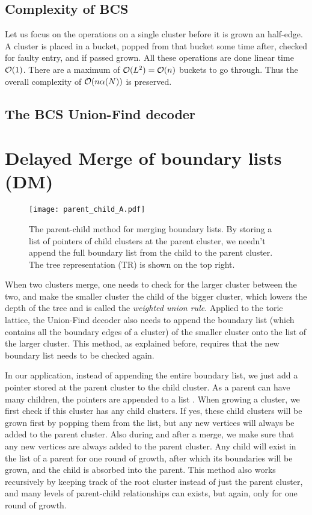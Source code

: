 \subsection{Complexity of BCS}
Let us focus on the operations on a single cluster before it is grown an half-edge. A cluster is placed in a bucket, popped from that bucket some time after, checked for faulty entry, and if passed grown. All these operations are done linear time $\mathcal{O}(1)$. There are a maximum of $\mathcal{O}(L^2) = \mathcal{O}(n)$ buckets to go through. Thus the overall complexity of $\mathcal{O}(n\alpha(N))$ is preserved.

\subsection{The BCS Union-Find decoder}




\section{Delayed Merge of boundary lists (DM)}

\begin{figure}
  \centering
  \texttt{[image: parent\_child\_A.pdf]}
  \caption{The parent-child method for merging boundary lists. By storing a list of pointers of child clusters at the parent cluster, we needn't append the full boundary list from the child to the parent cluster. The tree representation (TR) is shown on the top right. } \label{3.fig.parentchildA}
\end{figure}

When two clusters merge, one needs to check for the larger cluster between the two, and make the smaller cluster the child of the bigger cluster, which lowers the depth of the tree and is called the \emph{weighted union rule}. Applied to the toric lattice, the Union-Find decoder also needs to append the boundary list (which contains all the boundary edges of a cluster) of the smaller cluster onto the list of the larger cluster. This method, as explained before, requires that the new boundary list needs to be checked again.

In our application, instead of appending the entire boundary list, we just add a pointer stored at the parent cluster to the child cluster. As a parent can have many children, the pointers are appended to a list . When growing a cluster, we first check if this cluster has any child clusters. If yes, these child clusters will be grown first by popping them from the list, but any new vertices will always be added to the parent cluster. Also during and after a merge, we make sure that any new vertices are always added to the parent cluster. Any child will exist in the list of a parent for one round of growth, after which its boundaries will be grown, and the child is absorbed into the parent. This method also works recursively by keeping track of the root cluster instead of just the parent cluster, and many levels of parent-child relationships can exists, but again, only for one round of growth.

